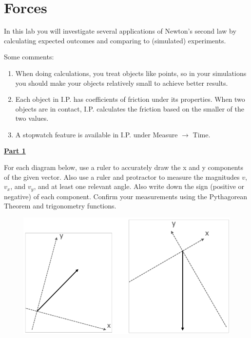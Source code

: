 \section{Forces}

In this lab you will investigate several applications of Newton's second law by calculating expected outcomes and comparing to (simulated) experiments.

Some comments:
\begin{enumerate}
\item When doing calculations, you treat objects like points, so in your simulations you should make your objects relatively small to achieve better results.
\item Each object in I.P. has coefficients of friction under its properties. When two objects are in contact, I.P. calculates the friction based on the smaller of the two values.
\item A stopwatch feature is available in I.P. under Measure $\rightarrow$ Time.
\end{enumerate}

\underline{\textbf{Part 1}} \par
For each diagram below, use a ruler to accurately draw the x and y components of the given vector.
Also use a ruler and protractor to measure the magnitudes $v$, $v_x$, and $v_y$, and at least one relevant angle.
Also write down the sign (positive or negative) of each component.
Confirm your measurements using the Pythagorean Theorem and trigonometry functions.
%
\begin{figure}[H]
\includegraphics[scale=0.70]{figures/forces/fig1.png}
\end{figure}

